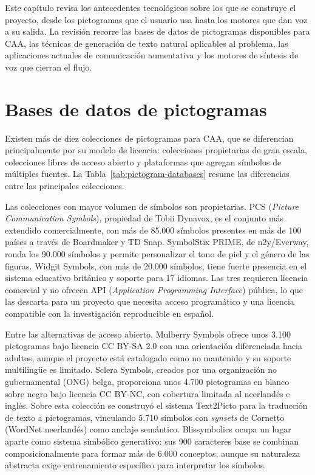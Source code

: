 Este capítulo revisa los antecedentes tecnológicos sobre los que se construye el proyecto, desde los pictogramas que el usuario usa hasta los motores que dan voz a su salida. La revisión recorre las bases de datos de pictogramas disponibles para CAA, las técnicas de generación de texto natural aplicables al problema, las aplicaciones actuales de comunicación aumentativa y los motores de síntesis de voz que cierran el flujo.

\section{Bases de datos de pictogramas}

Existen más de diez colecciones de pictogramas para CAA, que se diferencian principalmente por su modelo de licencia: colecciones propietarias de gran escala, colecciones libres de acceso abierto y plataformas que agregan símbolos de múltiples fuentes. La Tabla~\ref{tab:pictogram-databases} resume las diferencias entre las principales colecciones.

Las colecciones con mayor volumen de símbolos son propietarias. PCS (\textit{Picture Communication Symbols}), propiedad de Tobii Dynavox, es el conjunto más extendido comercialmente, con más de 85.000 símbolos presentes en más de 100 países a través de Boardmaker y TD Snap. SymbolStix PRIME, de n2y/Everway, ronda los 90.000 símbolos y permite personalizar el tono de piel y el género de las figuras. Widgit Symbols, con más de 20.000 símbolos, tiene fuerte presencia en el sistema educativo británico y soporte para 17 idiomas. Las tres requieren licencia comercial y no ofrecen API (\textit{Application Programming Interface}) pública, lo que las descarta para un proyecto que necesita acceso programático y una licencia compatible con la investigación reproducible en español.

Entre las alternativas de acceso abierto, Mulberry Symbols ofrece unos 3.100 pictogramas bajo licencia CC BY-SA 2.0 con una orientación diferenciada hacia adultos, aunque el proyecto está catalogado como no mantenido y su soporte multilingüe es limitado. Sclera Symbols, creados por una organización no gubernamental (ONG) belga, proporciona unos 4.700 pictogramas en blanco sobre negro bajo licencia CC BY-NC, con cobertura limitada al neerlandés e inglés. Sobre esta colección se construyó el sistema Text2Picto para la traducción de texto a pictogramas, vinculando 5.710 símbolos con \textit{synsets} de Cornetto (WordNet neerlandés) como anclaje semántico. Blissymbolics ocupa un lugar aparte como sistema simbólico generativo: sus 900 caracteres base se combinan composicionalmente para formar más de 6.000 conceptos, aunque su naturaleza abstracta exige entrenamiento específico para interpretar los símbolos.

